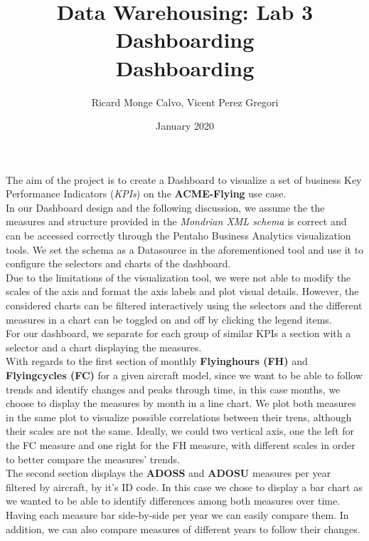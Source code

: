 \documentclass{article} %
\title{%
    Data Warehousing: Lab 3 Dashboarding \\
    \large Dashboarding}
\author{Ricard Monge Calvo, Vicent Perez Gregori}
\date{January 2020}
\begin{document}
\maketitle

The aim of the project is to create a Dashboard to visualize a set of business Key Performance Indicators (\textit{KPIs}) on the \textbf{ACME-Flying} use case.\\

In our Dashboard design and the following discussion, we assume the the measures and structure provided in the \textit{Mondrian XML schema} is correct and can be accessed correctly through the Pentaho Business Analytics visualization tools. We set the schema as a Datasource in the aforementioned tool and use it to configure the selectors and charts of the dashboard.\\

Due to the limitations of the visualization tool, we were not able to modify the scales of the axis and format the axis labels and plot visual details. However, the considered charts can be filtered interactively using the selectors and the different measures in a chart can be toggled on and off by clicking the legend items.\\

For our dashboard, we separate for each group of similar KPIs a section with a selector and a chart displaying the measures.\\

With regards to the first section of monthly \textbf{Flyinghours (FH)} and \textbf{Flyingcycles (FC)} for a given aircraft model, since we want to be able to follow trends and identify changes and peaks through time, in this case months, we choose to display the measures by month in a line chart. We plot both measures in the same plot to visualize possible correlations between their trens, although their scales are not the same. Ideally, we could two vertical axis, one the left for the FC measure and one right for the FH measure, with different scales in order to better compare the measures' trends.\\

The second section displays the \textbf{ADOSS} and \textbf{ADOSU} measures per year filtered by aircraft, by it's ID code. In this case we chose to display a bar chart as we wanted to be able to identify differences among both measures over time. Having each measure bar side-by-side per year we can easily compare them. In addition, we can also compare measures of different years to follow their changes.\\
\end{document}
